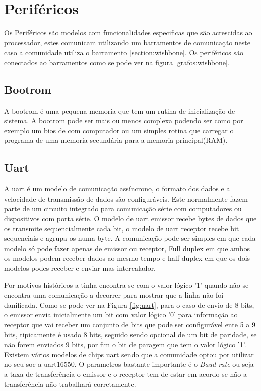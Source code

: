 \section{Periféricos}
\label{section:perifericos}

Os Periféricos são modelos com funcionalidades especificas que são acrescidas ao processador, estes comunicam utilizando um barramentos de comunicação neste caso a comunidade utiliza o barramento \ref{section:wishbone}. Os periféricos são conectados ao barramentos como se pode ver na figura \ref{grafos:wishbone}.

\subsection{Bootrom}

A bootrom é uma pequena memoria que tem um rutina de inicialização de sistema. A bootrom pode ser mais ou menos complexa podendo ser como por exemplo um \acrlong{bios} de com computador ou um simples rotina que carregar o programa de uma memoria secundária para a memoria principal(RAM).

\subsection{Uart}

A \acrshort{uart} é um modelo de comunicação assíncrono, o formato dos dados e a velocidade de transmissão de dados são configuráveis. Este normalmente fazem parte de um circuito integrado para comunicação série com computadores ou dispositivos com porta série. O modelo de \acrshort{uart} emissor recebe bytes de dados que os transmite sequencialmente cada bit, o modelo de \acrshort{uart} receptor recebe bit sequenciais e agrupa-os numa byte. A comunicação pode ser simples em que cada modelo só pode fazer apenas de emissor ou receptor, Full duplex em que ambos os modelos podem receber dados ao mesmo tempo e half duplex em que os dois modelos podes receber e enviar mas intercalador.

Por motivos históricos a tinha encontra-se com o valor lógico '1' quando não se encontra uma comunicação a decorrer para mostrar que a linha não foi danificada. Como se pode ver na Figura \ref{fig:uart}, para o caso de envio de 8 bits, o emissor envia inicialmente um bit com valor lógico '0' para informação ao receptor que vai receber um conjunto de bits que pode ser configurável ente 5 a 9 bits, tipicamente é usado 8 bits, seguido sendo opcional de um bit de paridade, se não forem enviados 9 bits, por fim o bit de paragem que tem o valor lógico '1'. Existem vários modelos de chips \acrshort{uart} sendo que a comunidade optou por utilizar no seu \acrshort{soc} a uart16550. O parametros bastante importante é o \textit{Baud rate} ou seja a taxa de transferência o emissor e o receptor tem de estar em acordo se não a transferência não trabalhará corretamente.

